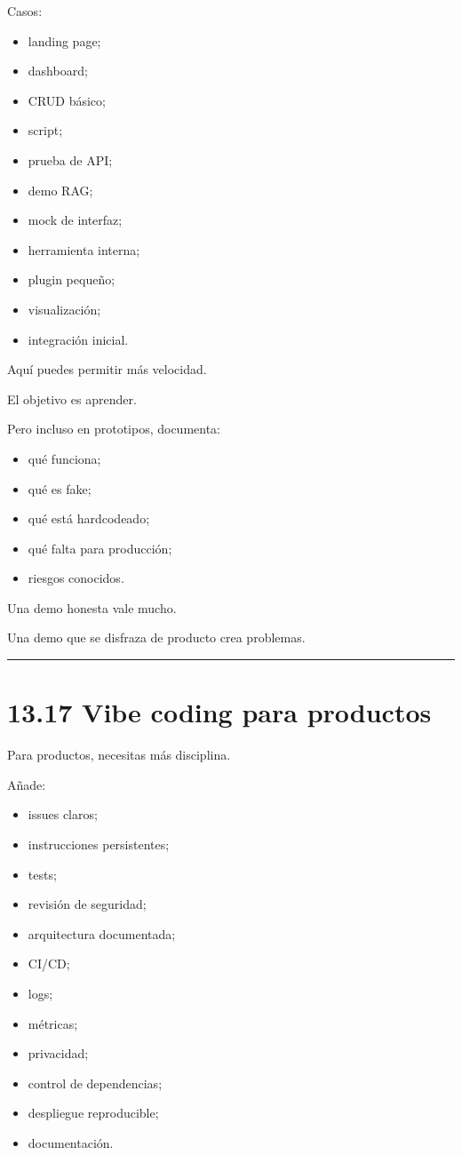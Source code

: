 Casos:

\begin{itemize}
\tightlist
\item
  landing page;
\item
  dashboard;
\item
  CRUD básico;
\item
  script;
\item
  prueba de API;
\item
  demo RAG;
\item
  mock de interfaz;
\item
  herramienta interna;
\item
  plugin pequeño;
\item
  visualización;
\item
  integración inicial.
\end{itemize}

Aquí puedes permitir más velocidad.

El objetivo es aprender.

Pero incluso en prototipos, documenta:

\begin{itemize}
\tightlist
\item
  qué funciona;
\item
  qué es fake;
\item
  qué está hardcodeado;
\item
  qué falta para producción;
\item
  riesgos conocidos.
\end{itemize}

Una demo honesta vale mucho.

Una demo que se disfraza de producto crea problemas.

\begin{center}\rule{0.5\linewidth}{0.5pt}\end{center}

\section{13.17 Vibe coding para
productos}\label{vibe-coding-para-productos}

Para productos, necesitas más disciplina.

Añade:

\begin{itemize}
\tightlist
\item
  issues claros;
\item
  instrucciones persistentes;
\item
  tests;
\item
  revisión de seguridad;
\item
  arquitectura documentada;
\item
  CI/CD;
\item
  logs;
\item
  métricas;
\item
  privacidad;
\item
  control de dependencias;
\item
  despliegue reproducible;
\item
  documentación.
\end{itemize}

